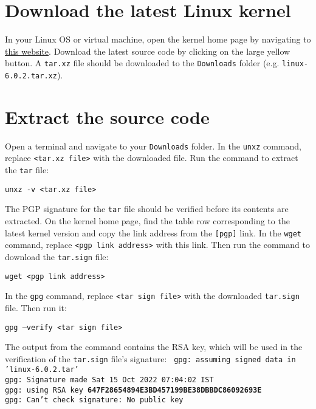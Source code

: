 \documentclass[12pt,a4paper]{report}
\begin{document}
\section{Download the latest Linux kernel}
In your Linux OS or virtual machine, open the kernel home page by navigating to \href{https://www.kernel.org/}{this website}. Download the latest source code by clicking on the large yellow button.
\newline
\newline
A \texttt{tar.xz} file should be downloaded to the \texttt{Downloads} folder (e.g. \texttt{\small linux-6.0.2.tar.xz}). 

\section{Extract the source code}
Open a terminal and navigate to your \texttt{Downloads} folder. In the \texttt{unxz} command, replace \texttt{<tar.xz file>} with the downloaded file. Run the command to extract the \texttt{tar} file:
\newline
\newline
\centerline{\texttt{unxz -v <tar.xz file>}}
\newline
\newline 
The PGP signature for the \texttt{tar} file should be verified before its contents are extracted. On the kernel home page, find the table row corresponding to the latest kernel version and copy the link address from the \texttt{[pgp]} link. In the \texttt{wget} command, replace \texttt{<pgp link address>} with this link. Then run the command to download the \texttt{tar.sign} file:
\newline
\newline
\centerline{\texttt{wget <pgp link address>}}
\newline
\newline 
In the \texttt{gpg} command, replace \texttt{<tar sign file>} with the downloaded \texttt{tar.sign} file. Then run it:
\newline
\newline
\centerline{\texttt{gpg --verify <tar sign file>}}
\newline
\newline 
The output from the command contains the RSA key, which will be used in the verification of the \texttt{tar.sign} file's signature:
\newline
\newline
\texttt{
gpg: assuming signed data in 'linux-6.0.2.tar'
\\
gpg: Signature made Sat 15 Oct 2022 07:04:02 IST
\\
gpg:                using RSA key \textbf{647F28654894E3BD457199BE38DBBDC86092693E}
\\
gpg: Can't check signature: No public key
}
\end{document}
